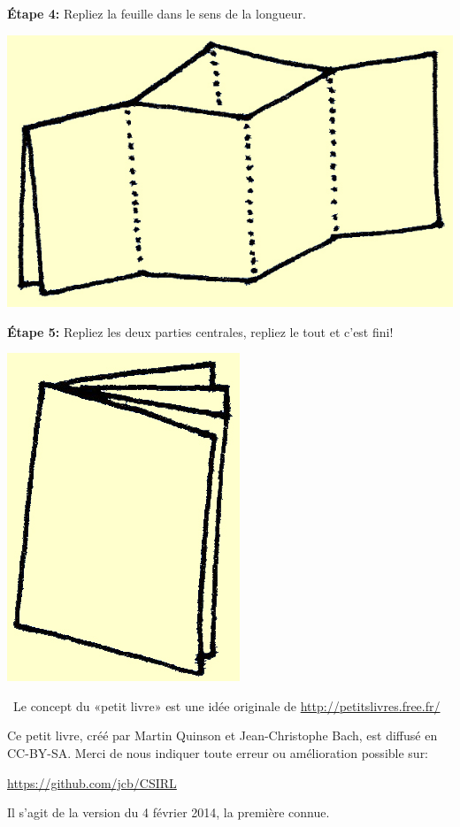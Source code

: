 \documentclass[a4paper,12pt]{article}
\begin{document}
\begin{minipage}[b]{.45\linewidth}
\end{minipage}\hfill\begin{minipage}[b]{.45\linewidth}
\noindent\textbf{Étape 4:} Repliez la feuille dans le sens de la longueur.\\

  \centerline{\includegraphics{img/ptitlivre-etape4.jpg}}
  
\medskip
\noindent\textbf{Étape 5:} Repliez les deux parties centrales, repliez
le tout et c'est fini!

  \centerline{\includegraphics{img/ptitlivre-etape5.jpg}}

\end{minipage}

\bigskip~\hfill{\small Le concept du «petit livre» est une idée
  originale de {\color{blue}\url{http://petitslivres.free.fr/}}}

\bigskip \bigskip \bigskip %
Ce petit livre, créé par Martin Quinson et Jean-Christophe Bach, est
diffusé en CC-BY-SA. Merci de nous indiquer toute erreur ou
amélioration possible sur:

\centerline{\color{blue}\url{https://github.com/jcb/CSIRL}}

\bigskip%
Il s'agit de la version du 4 février 2014, la première connue.
\end{document}
